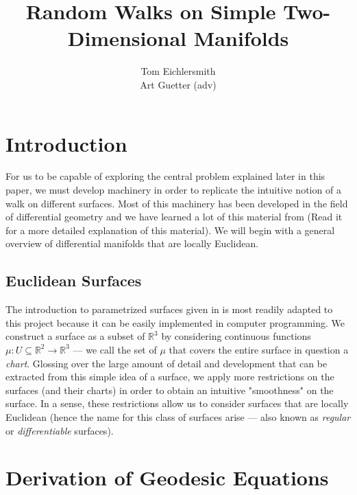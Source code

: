 \documentclass{article}
\title{Random Walks on Simple Two-Dimensional Manifolds}
\author{Tom Eichlersmith \\ Art Guetter (adv)}
\newcommand{\R}{\mathbb{R}}
\begin{document}
\section{Introduction}
	For us to be capable of exploring the central problem explained later in this paper, we must develop machinery in order to replicate the intuitive notion of a walk on different surfaces.
	Most of this machinery has been developed in the field of differential geometry and we have learned a lot of this material from \cite{BanchoffLovett_DiffGeo_2010} (Read it for a more detailed explanation of this material).
	We will begin with a general overview of differential manifolds that are locally Euclidean.
	
	\subsection{Euclidean Surfaces}
		The introduction to parametrized surfaces given in \cite{BanchoffLovett_DiffGeo_2010} is most readily adapted to this project because it can be easily implemented in computer programming.
		We construct a surface as a subset of $\R^3$ by considering continuous functions $\mu:U\subseteq\R^2 \to \R^3$ --- we call the set of $\mu$ that covers the entire surface in question a \textit{chart}.
		Glossing over the large amount of detail and development that can be extracted from this simple idea of a surface, we apply more restrictions on the surfaces (and their charts) in order to obtain an intuitive "smoothness" on the surface.
		In a sense, these restrictions allow us to consider surfaces that are locally Euclidean (hence the name for this class of surfaces arise --- also known as \textit{regular} or \textit{differentiable} surfaces).
		

\section{Derivation of Geodesic Equations}
	
\end{document}
